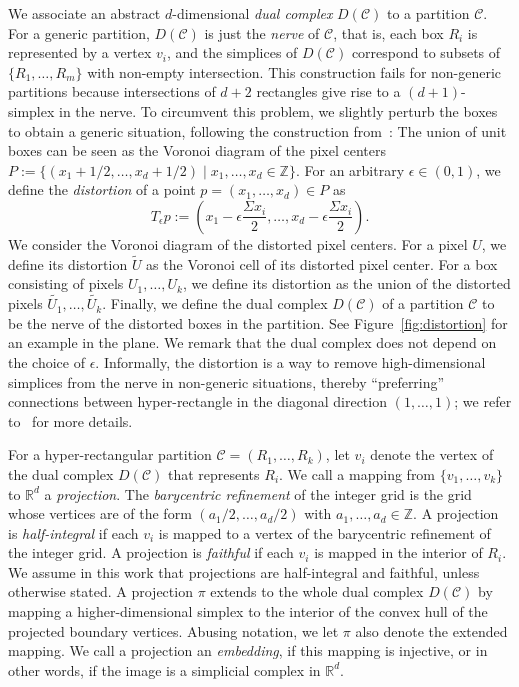 \documentclass[12pt]{article}
\newcommand{\R}{\mathbb{R}}
\newcommand{\Z}{\mathbb{Z}}
\newcommand{\eps}{\epsilon}
\newcommand{\partition}{\mathcal{C}}
\begin{document}
We associate an abstract $d$-dimensional \emph{dual complex} $D(\partition)$ to a partition $\partition$.
For a generic partition, $D(\partition)$ is just the \emph{nerve} of $\partition$, that is, each box $R_i$
is represented by a vertex $v_i$, and the simplices of $D(\partition)$ correspond to subsets
of $\{R_1,\ldots,R_m\}$ with non-empty intersection. This construction fails for non-generic
partitions because intersections of $d+2$ rectangles give rise to a $(d+1)$-simplex in the nerve.
To circumvent this problem, we slightly perturb the boxes to obtain a generic
situation, following the construction from~\cite{ek-freudenthal}: The union of unit boxes can
be seen as the Voronoi diagram of the pixel centers 
$P:=\{(x_1+1/2,\ldots,x_d+1/2) \mid x_1,\ldots,x_d\in\Z\}$.
For an arbitrary $\eps\in (0,1)$, we define the \emph{distortion} of a point $p=(x_1,\ldots,x_d)\in P$ as
\[T_\eps p := (x_1-\eps\frac{\Sigma x_i}{2},\ldots,x_d-\eps\frac{\Sigma x_i}{2}).\]
We consider the Voronoi diagram of the distorted pixel centers. 
For a pixel $U$, we define its distortion $\tilde{U}$ as the Voronoi cell of its 
distorted pixel center. For a box consisting
of pixels $U_1,\ldots,U_k$, we define its distortion
as the union of the distorted pixels $\tilde{U_1},\ldots,\tilde{U_k}$. Finally, we define
the dual complex $D(\partition)$ of a partition $\partition$ to be the nerve of the distorted boxes
in the partition. See Figure~\ref{fig:distortion} for an example in the plane. We remark that
the dual complex does not depend on the choice of $\eps$.
Informally, the distortion is a way to remove high-dimensional simplices from the nerve in
non-generic situations, thereby ``preferring'' connections between hyper-rectangle in the
diagonal direction $(1,\ldots,1)$; we refer to~\cite{ek-freudenthal} for more details.

For a hyper-rectangular partition $\partition=(R_1,\ldots,R_k)$, let $v_i$ denote
the vertex of the dual complex $D(\partition)$ that represents $R_i$. We call a mapping from
$\{v_1,\ldots,v_k\}$ to $\R^d$ a \emph{projection}. 
The \emph{barycentric refinement} of the integer grid is the grid whose vertices
are of the form $(a_1/2,\ldots,a_d/2)$ with $a_1,\ldots,a_d\in\Z$.
A projection is \emph{half-integral} if each $v_i$ is mapped to a vertex of the barycentric
refinement of the integer grid.
A projection is \emph{faithful} if each $v_i$ is mapped in the interior of $R_i$.
We assume in this work that projections are half-integral and faithful, unless otherwise stated.
A projection $\pi$ extends to the whole dual complex $D(\partition)$ by mapping a higher-dimensional simplex
to the interior of the convex hull of the projected boundary vertices. 
Abusing notation, we let $\pi$ also denote the extended mapping.
We call a projection an \emph{embedding},
if this mapping is injective, or in other words, if the image 
is a simplicial complex in $\R^d$. 
\end{document}
